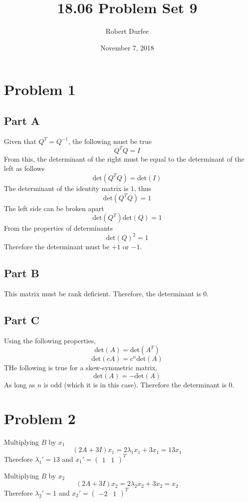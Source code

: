 \documentclass{article}
\title{18.06 Problem Set 9}
\author{Robert Durfee}
\date{November 7, 2018}
\begin{document}
\maketitle

\section*{Problem 1}

\subsection*{Part A}

Given that $Q^T = Q^{-1}$, the following must be true
$$ Q^{T} Q = I $$
From this, the determinant of the right must be equal to the determinant of
the left as follows
$$ \mathrm{det}(Q^T Q) = \mathrm{det}(I) $$
The determinant of the identity matrix is $1$, thus
$$ \mathrm{det}(Q^T Q) = 1 $$
The left side can be broken apart
$$ \mathrm{det}(Q^T) \mathrm{det}(Q) = 1 $$
From the properties of determinants
$$ \mathrm{det}(Q)^2 = 1 $$
Therefore the determinant must be $+1$ or $-1$.

\subsection*{Part B}

This matrix must be rank deficient. Therefore, the determinant is $0$.

\subsection*{Part C}

Using the following properties,
$$ \mathrm{det}(A) = \mathrm{det}(A^T) $$
$$ \mathrm{det}(c A) = c^n \mathrm{det}(A) $$
THe following is true for a skew-symmetric matrix,
$$ \mathrm{det}(A) = -\mathrm{det}(A) $$
As long as $n$ is odd (which it is in this case). Therefore the determinant
is $0$.

\section*{Problem 2}

Multiplying $B$ by $x_1$
$$ (2A + 3I) x_1 = 2 \lambda_1 x_1 + 3 x_1 = 13 x_1 $$
Therefore $\lambda_1' = 13$ and $x_1' = \begin{pmatrix} 1 & 1 \end{pmatrix}^T$

Multiplying $B$ by $x_2$
$$ (2A + 3I) x_2 = 2 \lambda_2 x_2 + 3 x_2 = x_2 $$
Therefore $\lambda_2' = 1$ and $x_2' = \begin{pmatrix} -2 & 1 \end{pmatrix}^T$
\end{document}

